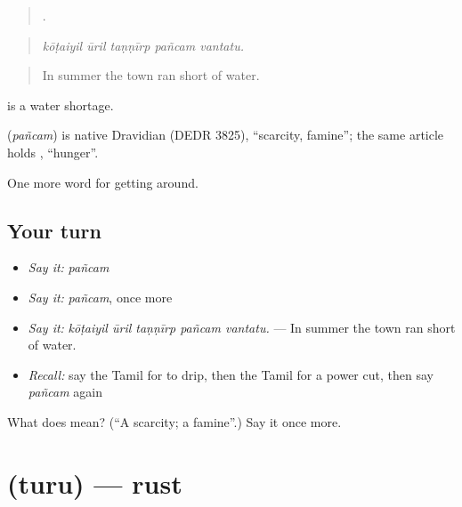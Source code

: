 \begin{quote}
    .
\end{quote}

\begin{quote}
\emph{kōṭaiyil ūril taṇṇīrp pañcam vantatu.}
\end{quote}

\begin{quote}
In summer the town ran short of water.
\end{quote}

  is a water shortage.

\begin{cousinweb}
\textbf{} (\emph{pañcam}) is native Dravidian (DEDR 3825), \textquotedblleft{}scarcity, famine\textquotedblright{}; the same article holds , \textquotedblleft{}hunger\textquotedblright{}.
\end{cousinweb}

\begin{grammarlens}[title={What you've built}]
One more word for getting around.
\end{grammarlens}

\subsection*{Your turn}
\begin{itemize}
\raggedright
  \item \emph{Say it:} \emph{pañcam}
  \item \emph{Say it:} \emph{pañcam}, once more
  \item \emph{Say it:} \emph{kōṭaiyil ūril taṇṇīrp pañcam vantatu.} — In summer the town ran short of water.
  \item \emph{Recall:} say the Tamil for to drip, then the Tamil for a power cut, then say \emph{pañcam} again
\end{itemize}

\begin{tcolorbox}[breakable,colback=teal!4,colframe=teal!35!black,title={Before you move on}]
What does  mean? (\textquotedblleft{}A scarcity; a famine\textquotedblright{}.) Say it once more.
\end{tcolorbox}
\section[\texorpdfstring{\ta{துரு} (turu)}{துரு (turu)}]{ (turu) — rust}

